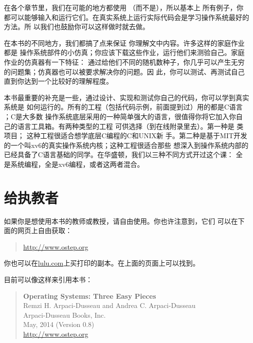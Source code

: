 在各个章节里，我们在可能的地方都使用
（而不是），所以基本上
所有例子，你都可以能够输入和运行它们。在真实系统上运行实际代码会是学习操作系统最好的方法。所
以我们也鼓励你可以这样做时就去做。

在本书的不同地方，我们都搞了点来保证
你理解文中内容。许多这样的家庭作业都是
操作系统部件的小仿真；你应该下载这些作业，运行他们来测验自己。家庭作业的仿真器有一下特征：
通过给他们不同的随机数种子，你几乎可以产生无穷的问题集；仿真器也可以被要求解决你的问题。因
此，你可以测试、再测试自己直到你达到一个比较好的理解程度。

本书最重要的补充是一些，通过设计、实现和测试你自己的代码，你可以学到真实系统是
如何运行的。所有的工程（包括代码示例，前面提到过）用的都是C语言
 ；C是大多数
操作系统底层采用的一种简单强大的语言，很值得你将它加入你自己的语言工具箱。有两种类型的工程
可供选择（到在线附录里去）。第一种是
类项目；
这种工程很适合想学底层C编程的C和UNIX新
手。第二种是基于MIT开发的一个叫xv6的真实操作系统内核；这种工程很适合那些
想深入到操作系统内部的已经具备了C语言基础的同学。在华盛顿，我们以三种不同方式开过这个课：
全是系统编程，全是xv6编程，或者这两者混合。

\clearpage

{}
\section*{给执教者}
如果你是想使用本书的教师或教授\cite{RichardP.Feynman2011}，请自由使用。你也许注意到，它们
可以在下面的网页上自由获取：

\begin{quote}
	\url{http://www.ostep.org}
\end{quote}

你也可以在\url{lulu.com}上买打印的副本。在上面的页面上可以找到。

目前可以像这样来引用本书： 
\begin{quote}
	\textbf{Operating Systems: Three Easy Pieces} \\
	Remzi H. Arpaci-Dusseau and Andrea C. Arpaci-Dusseau \\
	Arpaci-Dusseau Books, Inc. \\
	May, 2014 (Version 0.8) \\
	\url{http://www.ostep.org}
\end{quote}

